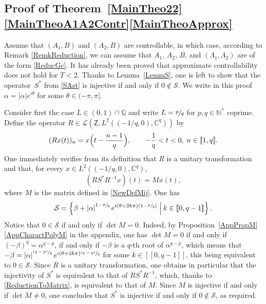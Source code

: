 \documentclass[JEP,XML,SOM,Unicode]{cedram}
\newcommand{\psfrac}[2]{\sfrac{(#1)}{#2}}
\newcommand{\llbracket}{[\![}
\newcommand{\rrbracket}{]\!]}
\theoremstyle{plain}
\theoremstyle{definition}
\newcommand{\midsuchthat}{\;\middle|\:}
\newcommand{\abs}[1]{\left\lvert #1\right \rvert}
\begin{document}
\subsection{Proof of Theorem~\ref{MainTheo22}\eqref{MainTheoA1A2Contr}\eqref{MainTheoApprox}}

Assume that $(A_1, B)$ and $(A_2, B)$ are controllable, in which case, according to Remark \ref{RemkReduction}, we can assume that $A_1$, $A_2$, $B$, and $(\Lambda_1, \Lambda_2)$ are of the form \eqref{ReducGc}. It has already been proved that approximate controllability does not hold for $T < 2$. Thanks to Lemma~\ref{LemmS}, one is left to show that the operator~$S^\ast$ from \eqref{SAst} is injective if and only if $0 \notin \mathcal S$. We write in this proof $\alpha = \abs{\alpha} e^{i\theta}$ for some $\theta \in (-\pi, \pi]$.

Consider first the case $L \in (0, 1) \cap \mathbb Q$ and write $L = \sfrac{p}{q}$ for $p, q \in \mathbb N^\ast$ coprime. Define the operator $R \in \mathcal L\left(\mathsf Z, L^2\left(\left(-{1}/{q}, 0\right), \mathbb C^q\right)\right)$ by
\[
(R x(t))_n = x\Bigl(t - \frac{n-1}{q}\Bigr), \qquad -\frac{1}{q} < t < 0, \; n \in \llbracket 1, q\rrbracket.
\]
One immediately verifies from its definition that $R$ is a unitary transformation and that, for every $x \in L^2\left(\left(-{1}/{q}, 0\right), \mathbb C^q\right)$,
\begin{equation}
\label{ReductionToMatrix}
(R S^\ast R^{-1} x)(t) = M x(t),
\end{equation}
where $M$ is the matrix defined in \eqref{NewDefMij}. One has
\begin{equation}
\label{CRational}
\mathcal S = \left\{\beta + \abs{\alpha}^{1 - \sfrac{p}{q}} e^{i (\theta + 2 k \pi)\left(1 - \sfrac{p}{q}\right)} \midsuchthat k \in \llbracket 0, q - 1\rrbracket\right\}.
\end{equation}
Notice that $0 \in \mathcal S$ if and only if $\det M = 0$. Indeed, by Proposition~\ref{AppPropM}\eqref{AppCharactPolyM} in the appendix, one has $\det M = 0$ if and only if $(-\beta)^q = \alpha^{q - p}$, \ie if and only if $-\beta$ is a $q$-th root of $\alpha^{q - p}$, which means that $-\beta = \abs{\alpha}^{\psfrac{q - p}{q}} e^{i(\theta + 2 k \pi)\psfrac{q - p}{q}}$ for some $k \in \llbracket 0, q-1\rrbracket$, this being equivalent to $0 \in \mathcal S$. Since $R$ is a unitary transformation, one obtains in particular that the injectivity of $S^\ast$ is equivalent to that of $R S^\ast R^{-1}$, which, thanks to \eqref{ReductionToMatrix}, is equivalent to that of $M$. Since $M$ is injective if and only if $\det M \neq 0$, one concludes that $S^\ast$ is injective if and only if $0 \notin \mathcal S$, as required.
\end{document}
